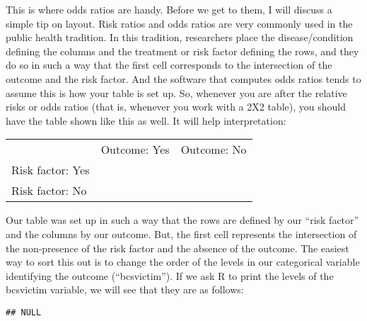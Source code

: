 \documentclass[
]{book}
\newenvironment{Shaded}{\begin{snugshade}}{\end{snugshade}}
\newcommand{\FunctionTok}[1]{\textcolor[rgb]{0.13,0.29,0.53}{\textbf{#1}}}
\newcommand{\NormalTok}[1]{#1}
\newcommand{\SpecialCharTok}[1]{\textcolor[rgb]{0.81,0.36,0.00}{\textbf{#1}}}
\begin{document}
This is where odds ratios are handy. Before we get to them, I will discuss a simple tip on layout. Risk ratios and odds ratios are very commonly used in the public health tradition. In this tradition, researchers place the disease/condition defining the columns and the treatment or risk factor defining the rows, and they do so in such a way that the first cell corresponds to the intersection of the outcome and the risk factor. And the software that computes odds ratios tends to assume this is how your table is set up. So, whenever you are after the relative risks or odds ratios (that is, whenever you work with a 2X2 table), you should have the table shown like this as well. It will help interpretation:

\begin{longtable}[]{@{}
  >{\raggedright\arraybackslash}p{}
  >{\raggedright\arraybackslash}p{}
  >{\raggedright\arraybackslash}p{}@{}}
\toprule\noalign{}
\endhead
\bottomrule\noalign{}
\endlastfoot
& Outcome: Yes & Outcome: No \\
Risk factor: Yes & & \\
Risk factor: No & & \\
\end{longtable}

Our table was set up in such a way that the rows are defined by our ``risk factor'' and the columns by our outcome. But, the first cell represents the intersection of the non-presence of the risk factor and the absence of the outcome. The easiest way to sort this out is to change the order of the levels in our categorical variable identifying the outcome (``bcsvictim''). If we ask R to print the levels of the bcsvictim variable, we will see that they are as follows:

\begin{Shaded}
\end{Shaded}

\begin{verbatim}
## NULL
\end{verbatim}

\begin{Shaded}
\end{Shaded}
\end{document}
